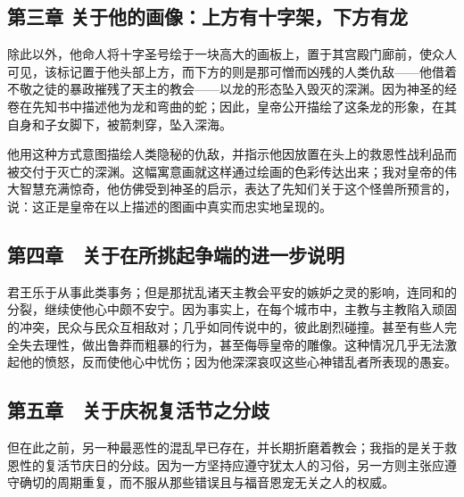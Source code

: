 
\subsection{第三章 关于他的画像：上方有十字架，下方有龙}

除此以外，他命人将十字圣号绘于一块高大的画板上，置于其宫殿门廊前，使众人可见，该标记置于他头部上方，而下方的则是那可憎而凶残的人类仇敌——他借着不敬之徒的暴政摧残了天主的教会——以龙的形态坠入毁灭的深渊。因为神圣的经卷在先知书中描述他为龙和弯曲的蛇；因此，皇帝公开描绘了这条龙的形象，在其自身和子女脚下，被箭刺穿，坠入深海。\par

他用这种方式意图描绘人类隐秘的仇敌，并指示他因放置在头上的救恩性战利品而被交付于灭亡的深渊。这幅寓意画就这样通过绘画的色彩传达出来；我对皇帝的伟大智慧充满惊奇，他仿佛受到神圣的启示，表达了先知们关于这个怪兽所预言的，说：这正是皇帝在以上描述的图画中真实而忠实地呈现的。\par


\subsection{第四章　关于在所挑起争端的进一步说明}

君王乐于从事此类事务；但是那扰乱诸天主教会平安的嫉妒之灵的影响，连同和的分裂，继续使他心中颇不安宁。因为事实上，在每个城市中，主教与主教陷入顽固的冲突，民众与民众互相敌对；几乎如同传说中的，彼此剧烈碰撞。甚至有些人完全失去理性，做出鲁莽而粗暴的行为，甚至侮辱皇帝的雕像。这种情况几乎无法激起他的愤怒，反而使他心中忧伤；因为他深深哀叹这些心神错乱者所表现的愚妄。\par


\subsection{第五章　关于庆祝复活节之分歧}

但在此之前，另一种最恶性的混乱早已存在，并长期折磨着教会；我指的是关于救恩性的复活节庆日的分歧。因为一方坚持应遵守犹太人的习俗，另一方则主张应遵守确切的周期重复，而不服从那些错误且与福音恩宠无关之人的权威。\par

